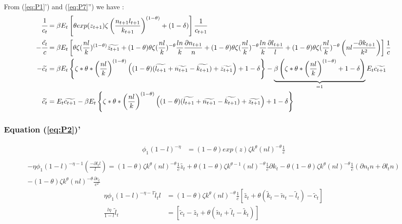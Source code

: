 \documentclass[english]{article}
\begin{document}
From (\ref{eq:P1}') and (\ref{eq:P7}'') we have :
\begin{align*}
  \cfrac{1}{c_t} &=\beta E_{t}\left[\theta exp(z_{t+1})\zeta\left(\frac{n_{t+1}l_{t+1}}{k_{t+1}}\right)^{(1-\theta)}+(1-\delta)\right]\frac{1}{c_{t+1}} \\
-\cfrac{\tilde{c_t}}{c} &=\beta E_{t}\left[\theta\zeta(\frac{nl}{k})^{(1-\theta)}\widetilde{z_{t+1}}+(1-\theta)\theta\zeta(\frac{nl}{k})^{-\theta}\frac{ln}{k}\frac{\partial n_{t+1}}{n}+(1-\theta)\theta\zeta(\frac{nl}{k})^{-\theta}\frac{ln}{k}\frac{\partial l_{t+1}}{l}+(1-\theta)\theta\zeta(\frac{nl}{k})^{-\theta}\left(nl\frac{-\partial k_{t+1}}{k^{2}}\right)\right]\frac{1}{c} \\
-\widetilde{c_t} &= \beta E_{t}\left\{\zeta*\theta*\left(\frac{nl}{k}\right)^{(1-\theta)}\left((1-\theta)(\widetilde{l_{t+1}}+\widetilde{n_{t+1}}-\widetilde{k_{t+1}})+\widetilde{z_{t+1}}\right)+1-\delta\right\}-\underbrace{\beta\left(\zeta*\theta*\left(\frac{nl}{k}\right)^{(1-\theta)}+1-\delta\right)}_{=1}E_t\widetilde{c_{t+1}}\\
\widetilde{c_t} &= E_t\widetilde{c_{t+1}}-\beta E_{t}\left\{\zeta*\theta*\left(\frac{nl}{k}\right)^{(1-\theta)}\left((1-\theta)(\widetilde{l_{t+1}}+\widetilde{n_{t+1}}-\widetilde{k_{t+1}})+\widetilde{z_{t+1}}\right)+1-\delta\right\}
\end{align*}

\subsubsection{Equation (\ref{eq:P2})'}
\begin{align*}
  \phi_{1}\left(1-l\right)^{-\eta} &= (1-\theta)exp(z)\zeta k^{\theta}(nl)^{-\theta}\frac{1}{c} \\
\end{align*}
\begin{multline*}
  -\eta\phi_{1}\left(1-l\right)^{-\eta-1}(\frac{-\partial l_{t}l}{l}) = (1-\theta)\zeta k^{\theta}(nl)^{-\theta}\frac{1}{c}\widetilde{z_{t}}+\theta(1-\theta)\zeta k^{\theta-1}(nl)^{-\theta}\frac{1}{c}\partial k_{t}-\theta(1-\theta)\zeta k^{\theta}(nl)^{-\theta}\frac{1}{c}\left(\partial n_{t}n+\partial l_{t}n\right)\\-(1-\theta)\zeta k^{\theta}(nl)^{-\theta}\frac{\partial c_{t}}{c^{2}}
\end{multline*}
\begin{align*}
\eta\phi_{1}\left(1-l\right)^{-\eta-1}\widetilde{l}_{t}l &=(1-\theta)\zeta k^{\theta}(nl)^{-\theta}\frac{1}{c}\left[\widetilde{z_{t}}+\theta\left(\widetilde{k}_{t}-\widetilde{n}_{t}-\widetilde{l}_{t}\right)-\widetilde{c}_{t}\right]\\
  \frac{l\eta}{1-l}\widetilde{l}_{t}&=\left[\widetilde{c}_{t}-\widetilde{z_{t}}+\theta\left(\widetilde{n}_{t}+\widetilde{l}_{t}-\widetilde{k}_{t}\right)\right]
\end{align*}
\end{document}

